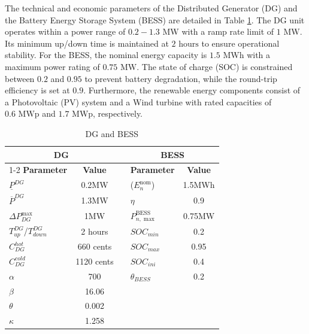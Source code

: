 \documentclass[preprint,12pt]{elsarticle}
\begin{document}
    The technical and economic parameters of the Distributed Generator (DG) and the Battery Energy Storage System (BESS) are detailed in Table \ref{table:DG_BESS_parameters}. The DG unit operates within a power range of $0.2-1.3 \text{ MW}$ with a ramp rate limit of $1 \text{ MW}$. Its minimum up/down time is maintained at $2 \text{ hours}$ to ensure operational stability. For the BESS, the nominal energy capacity is $1.5 \text{ MWh}$ with a maximum power rating of $0.75 \text{ MW}$. The state of charge (SOC) is constrained between $0.2$ and $0.95$ to prevent battery degradation, while the round-trip efficiency is set at $0.9$. Furthermore, the renewable energy components consist of a Photovoltaic (PV) system and a Wind turbine with rated capacities of $0.6 \text{ MWp}$ and $1.7 \text{ MWp}$, respectively.
    
    \begin{table}[htbp]
      \centering
      \caption{ DG and BESS }
      \begin{tabular}{lc p{0.5cm} lc} %
        \toprule
        \multicolumn{2}{c}{\textbf{DG}} & & \multicolumn{2}{c}{\textbf{BESS}} \\
        \cmidrule{1-2} \cmidrule{4-5}
        \textbf{Parameter} & \textbf{Value} & & \textbf{Parameter} & \textbf{Value} \\
        \midrule
        $\underline{P}^{DG}$      & 0.2MW    & & ($E_{n}^{\text{nom}}$)& 1.5MWh   \\
        $\overline{P}^{DG}$       & 1.3MW   & & $\eta $             & 0.9   \\
        $\Delta P_{DG}^{\max}$    & 1MW   & & $P_{n,\max}^{\text{BESS}}$     & 0.75MW    \\
        $T^{DG}_{up}$/$T^{DG}_{down}$ & 2 hours     & & $SOC_{min}$         & 0.2   \\
        $C_{DG}^{hot}$            & 660 cents   & & $SOC_{max}$         & 0.95  \\
        $C_{DG}^{cold}$           & 1120 cents  & & $SOC_{ini}$         & 0.4   \\
        $\alpha$                  & 700   & & $\theta_{BESS}$            & 0.2   \\
        $\beta$                   & 16.06 & &                     &       \\
        $\theta$                  & 0.002 & &                     &       \\
        $\kappa$                    & 1.258 & &                     &       \\
        \bottomrule
      \end{tabular}
      \label{table:DG_BESS_parameters}
    \end{table} 
    
\end{document}
